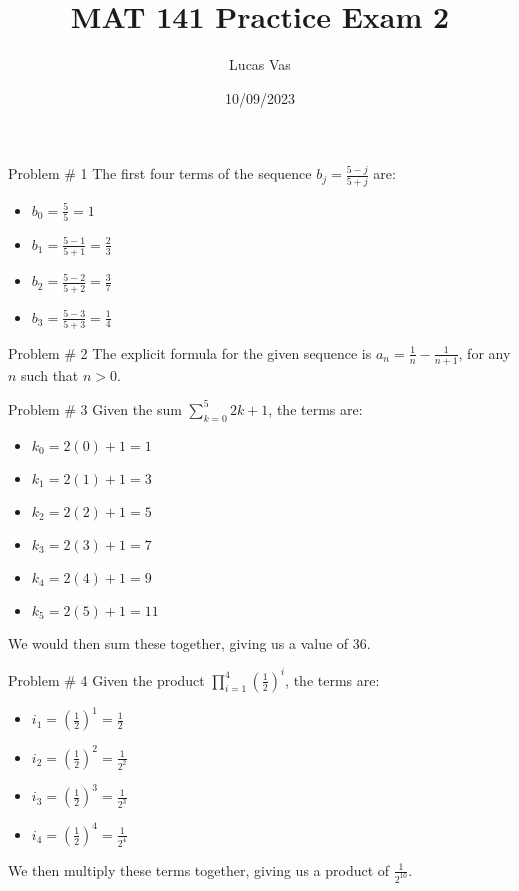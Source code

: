 \documentclass[12pt]{article}
\title{MAT 141 Practice Exam 2}
\author{Lucas Vas}
\date{10/09/2023}
\begin{document}
\markboth{\theauthor}{\thetitle}

\maketitle


    \begin{problem}{Problem \# 1}
        The first four terms of the sequence $b_j = \frac{5-j}{5+j}$ are:
        \begin{itemize}
            \item[] $b_0 = \frac{5}{5} = 1$
            \item[] $b_1 = \frac{5-1}{5+1} = \frac{2}{3}$
            \item[] $b_2 = \frac{5-2}{5+2} = \frac{3}{7}$
            \item[] $b_3 = \frac{5-3}{5+3} = \frac{1}{4}$
        \end{itemize}
    \end{problem}

    \begin{problem}{Problem \# 2}
        The explicit formula for the given sequence is $a_n = \frac{1}{n} - \frac{1}{n+1}$, for any $n$ such that $n > 0$.
    \end{problem}

    \begin{problem}{Problem \# 3}
        Given the sum $\sum_{k=0}^{5} 2k+1$, the terms are:
        \begin{itemize}
            \item[] $k_0 = 2(0)+1 = 1$
            \item[] $k_1 = 2(1)+1 = 3$
            \item[] $k_2 = 2(2)+1 = 5$
            \item[] $k_3 = 2(3)+1 = 7$
            \item[] $k_4 = 2(4)+1 = 9$
            \item[] $k_5 = 2(5)+1 = 11$
        \end{itemize}
        We would then sum these together, giving us a value of $36$.
    \end{problem}
    
    \begin{problem}{Problem \# 4}
        Given the product $\prod_{i=1}^{4} (\frac{1}{2})^i$, the terms are:
        \begin{itemize}
            \item[] $i_1 = (\frac{1}{2})^1 = \frac{1}{2}$
            \item[] $i_2 = (\frac{1}{2})^2 = \frac{1}{2^2}$
            \item[] $i_3 = (\frac{1}{2})^3 = \frac{1}{2^3}$
            \item[] $i_4 = (\frac{1}{2})^4 = \frac{1}{2^4}$
        \end{itemize}
        We then multiply these terms together, giving us a product of $\frac{1}{2^{10}}$.
    \end{problem}
\end{document}
